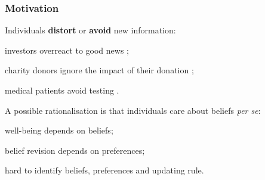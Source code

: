 \documentclass[usenames,dvipsnames,aspectratio=169,11pt,handout]{beamer}
\begin{document}
\begin{frame}
	\maketitle

\end{frame}

\begin{frame}\frametitle{Motivation}

	Individuals \textbf{distort} or \textbf{avoid} new information:

	\vfill

	\begin{wideitemize}
		\item investors overreact to good news \citep{danielOverconfidentInvestorsPredictable2015};
		\item charity donors ignore the impact of their donation \citep{niehausTheoryGoodIntentions2014};
		\item medical patients avoid testing \citep{golmanInformationAvoidance2017}.
	\end{wideitemize} \pause

	\vfill

	A possible rationalisation is that individuals care about beliefs \textit{per se}:

	\vfill

	\begin{wideitemize}
		\item well-being depends on beliefs;
		\item belief revision depends on preferences;
		\item hard to identify beliefs, preferences and updating rule.
	\end{wideitemize}

\end{frame}
\end{document}
